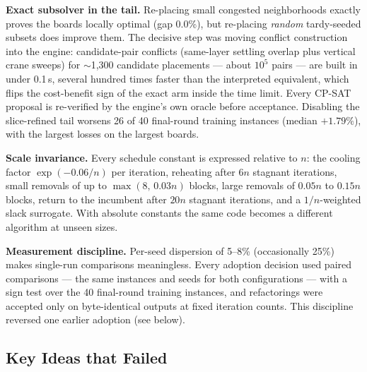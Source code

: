 \documentclass[runningheads]{llncs}
\begin{document}
\textbf{Exact subsolver in the tail.} Re-placing small congested
neighborhoods exactly proves the boards locally optimal (gap 0.0\%), but
re-placing \emph{random} tardy-seeded subsets does improve them. The decisive
step was moving conflict construction into the engine: candidate-pair
conflicts (same-layer settling overlap plus vertical crane sweeps) for
$\sim$1{,}300 candidate placements --- about $10^5$ pairs --- are built in
under 0.1\,s, several hundred times faster than the interpreted equivalent,
which flips the cost-benefit sign of the exact arm inside the time limit.
Every CP-SAT proposal is re-verified by the engine's own oracle before
acceptance. Disabling the slice-refined tail worsens 26 of 40 final-round
training instances (median $+1.79\%$), with the largest losses on the largest
boards.

\textbf{Scale invariance.} Every schedule constant is expressed relative to
$n$: the cooling factor $\exp(-0.06/n)$ per iteration, reheating after $6n$
stagnant iterations, small removals of up to $\max(8,\, 0.03n)$ blocks,
large removals of $0.05n$ to $0.15n$ blocks, return to the incumbent after
$20n$ stagnant iterations, and a $1/n$-weighted slack surrogate. With
absolute constants the same code becomes a different algorithm at unseen
sizes.

\textbf{Measurement discipline.} Per-seed dispersion of 5--8\% (occasionally
25\%) makes single-run comparisons meaningless. Every adoption decision used
paired comparisons --- the same instances and seeds for both configurations
--- with a sign test over the 40 final-round training instances, and
refactorings were accepted only on byte-identical outputs at fixed iteration
counts. This discipline reversed one earlier adoption (see below).

\subsection{Key Ideas that Failed}
\end{document}
